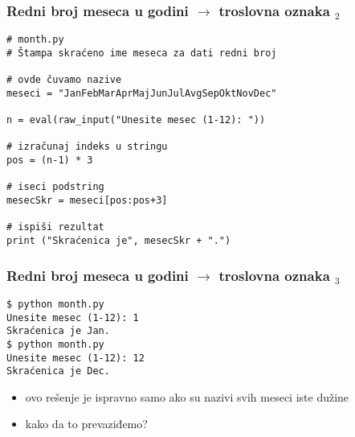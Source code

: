 \documentclass[utf8,compress]{beamer}
\begin{document}

\begin{frame}[fragile,shrink=10]
  \frametitle{Redni broj meseca u godini $\rightarrow$ troslovna oznaka $_2$}
\begin{verbatim}
# month.py
# Štampa skraćeno ime meseca za dati redni broj

# ovde čuvamo nazive
meseci = "JanFebMarAprMajJunJulAvgSepOktNovDec"

n = eval(raw_input("Unesite mesec (1-12): "))

# izračunaj indeks u stringu
pos = (n-1) * 3

# iseci podstring
mesecSkr = meseci[pos:pos+3]

# ispiši rezultat
print ("Skraćenica je", mesecSkr + ".")
\end{verbatim}
\end{frame}

\begin{frame}[fragile]
  \frametitle{Redni broj meseca u godini $\rightarrow$ troslovna oznaka $_3$}
\begin{verbatim}
$ python month.py
Unesite mesec (1-12): 1
Skraćenica je Jan.
$ python month.py
Unesite mesec (1-12): 12
Skraćenica je Dec.
\end{verbatim}
  \begin{itemize}
    \item ovo rešenje je ispravno samo ako su nazivi svih meseci iste dužine
    \item kako da to prevaziđemo?
  \end{itemize}
\end{frame}
\end{document}
